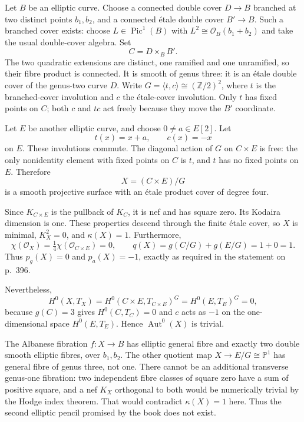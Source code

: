 \begin{example}
\label{cp2-x-counterexample}
Let $B$ be an elliptic curve. Choose a connected double cover $D\to B$ branched at two distinct points $b_1,b_2$, and a connected étale double cover $B'\to B$. Such a branched cover exists: choose $L\in\operatorname{Pic}^1(B)$ with $L^2\cong\mathcal O_B(b_1+b_2)$ and take the usual double-cover algebra. Set
\[
 C=D\times_B B'.
\]
The two quadratic extensions are distinct, one ramified and one unramified, so their fibre product is connected. It is smooth of genus three: it is an étale double cover of the genus-two curve $D$. Write $G=\langle t,c\rangle\cong(\mathbb Z/2)^2$, where $t$ is the branched-cover involution and $c$ the étale-cover involution. Only $t$ has fixed points on $C$; both $c$ and $tc$ act freely because they move the $B'$ coordinate.

Let $E$ be another elliptic curve, and choose $0\ne a\in E[2]$. Let
\[
 t(x)=x+a,\qquad c(x)=-x
\]
on $E$. These involutions commute. The diagonal action of $G$ on $C\times E$ is free: the only nonidentity element with fixed points on $C$ is $t$, and $t$ has no fixed points on $E$. Therefore
\[
 X=(C\times E)/G
\]
is a smooth projective surface with an étale product cover of degree four.

Since $K_{C\times E}$ is the pullback of $K_C$, it is nef and has square zero. Its Kodaira dimension is one. These properties descend through the finite étale cover, so $X$ is minimal, $K_X^2=0$, and $\kappa(X)=1$. Furthermore,
\[
 \chi(\mathcal O_X)=\tfrac14\chi(\mathcal O_{C\times E})=0,
 \qquad
 q(X)=g(C/G)+g(E/G)=1+0=1.
\]
Thus $p_g(X)=0$ and $p_a(X)=-1$, exactly as required in the statement on p.~396.

Nevertheless,
\[
 H^0(X,T_X)
 =H^0(C\times E,T_{C\times E})^G
 =H^0(E,T_E)^G=0,
\]
because $g(C)=3$ gives $H^0(C,T_C)=0$ and $c$ acts as $-1$ on the one-dimensional space $H^0(E,T_E)$. Hence $\operatorname{Aut}^0(X)$ is trivial.

The Albanese fibration $f:X\to B$ has elliptic general fibre and exactly two double smooth elliptic fibres, over $b_1,b_2$. The other quotient map $X\to E/G\cong\mathbb P^1$ has general fibre of genus three, not one. There cannot be an additional transverse genus-one fibration: two independent fibre classes of square zero have a sum of positive square, and a nef $K_X$ orthogonal to both would be numerically trivial by the Hodge index theorem. That would contradict $\kappa(X)=1$ here. Thus the second elliptic pencil promised by the book does not exist.
\end{example}

